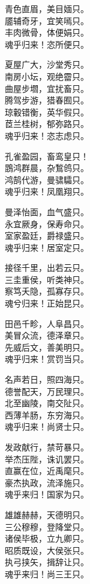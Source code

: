 \documentclass[]{article}
\begin{document}
青色直眉，美目媔只。\\
靥辅奇牙，宜笑嘕只。\\
丰肉微骨，体便娟只。\\
魂乎归来！恣所便只。

夏屋广大，沙堂秀只。\\
南房小坛，观绝霤只。\\
曲屋步壛，宜扰畜只。\\
腾驾步游，猎春囿只。\\
琼轂错衡，英华假只。\\
茝兰桂树，郁弥路只。\\
魂乎归来！恣志虑只。

孔雀盈园，畜鸾皇只！\\
鵾鸿群晨，杂鶖鸧只。\\
鸿鹄代游，曼骕驦只。\\
魂乎归来！凤凰翔只。

曼泽怡面，血气盛只。\\
永宜厥身，保寿命只。\\
室家盈廷，爵禄盛只。\\
魂乎归来！居室定只。

接径千里，出若云只。\\
三圭重侯，听类神只。\\
察笃夭隐，孤寡存只。\\
魂兮归来！正始昆只。

田邑千畛，人阜昌只。\\
美冒众流，德泽章只。\\
先威后文，善美明只。\\
魂乎归来！赏罚当只。

名声若日，照四海只。\\
德誉配天，万民理只。\\
北至幽陵，南交阯只。\\
西薄羊肠，东穷海只。\\
魂乎归来！尚贤士只。

发政献行，禁苛暴只。\\
举杰压陛，诛讥罢只。\\
直赢在位，近禹麾只。\\
豪杰执政，流泽施只。\\
魂乎来归！国家为只。

雄雄赫赫，天德明只。\\
三公穆穆，登降堂只。\\
诸侯毕极，立九卿只。\\
昭质既设，大侯张只。\\
执弓挟矢，揖辞让只。\\
魂乎来归！尚三王只。
\end{document}
